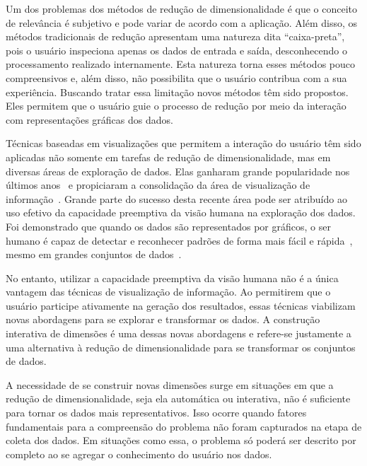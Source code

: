 Um dos problemas dos métodos de redução de dimensionalidade
é que o conceito de relevância é subjetivo e pode variar de
acordo com a aplicação. Além disso, os métodos tradicionais
de redução apresentam uma natureza dita ``caixa-preta'',
pois o usuário inspeciona apenas os dados de entrada e
saída, desconhecendo o processamento realizado internamente.
Esta natureza torna esses métodos pouco compreensivos e,
além disso, não possibilita que o usuário contribua com a
sua experiência. Buscando tratar essa limitação novos
métodos têm sido propostos. Eles permitem que o usuário guie
o processo de redução por meio da interação com
representações gráficas dos dados.

Técnicas baseadas em visualizações que permitem a
interação do usuário têm sido aplicadas não somente em
tarefas de redução de dimensionalidade, mas em diversas
áreas de exploração de dados. Elas ganharam grande
popularidade nos últimos anos~\cite{State2012} e propiciaram
a consolidação da área de visualização de
informação~\cite{Keim2002}. Grande parte do sucesso desta
recente área pode ser atribuído ao uso efetivo da capacidade
preemptiva da visão humana na exploração dos dados. Foi
demonstrado que quando os dados são representados por 
gráficos, o ser humano é capaz de detectar e reconhecer
padrões de forma mais fácil e rápida~\cite{Healey1995},
mesmo em grandes conjuntos de dados~\cite{Fodor2002}. 

No entanto, utilizar a capacidade preemptiva da visão humana
não é a única vantagem das técnicas de visualização de
informação. Ao permitirem que o usuário participe ativamente
na geração dos resultados, essas técnicas viabilizam novas
abordagens para se explorar e transformar os dados. A
construção interativa de dimensões é uma dessas novas
abordagens e refere-se justamente a uma alternativa à
redução de dimensionalidade para se transformar os conjuntos
de dados.

A necessidade de se construir novas dimensões surge em
situações em que a redução de dimensionalidade, seja ela
automática ou interativa, não é suficiente para tornar os
dados mais representativos. Isso ocorre quando fatores
fundamentais para a compreensão do problema não foram
capturados na etapa de coleta dos dados. Em situações como
essa, o problema só poderá ser descrito por completo ao se
agregar o conhecimento do usuário nos dados.

